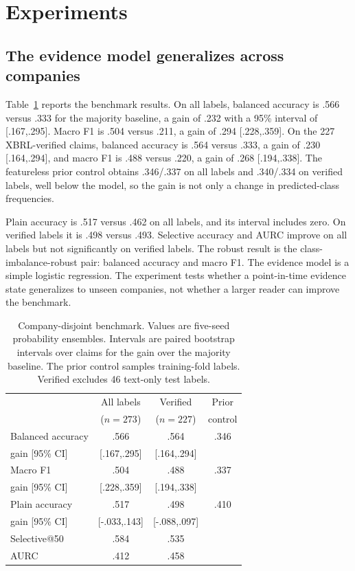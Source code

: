 \documentclass[11pt]{article}
\begin{document}
\section{Experiments}
\label{sec:experiments}

\subsection{The evidence model generalizes across companies}
Table~\ref{tab:benchmark} reports the benchmark results. On all labels, balanced accuracy is .566 versus .333 for the majority baseline, a gain of .232 with a 95\% interval of [.167,.295]. Macro F1 is .504 versus .211, a gain of .294 [.228,.359]. On the 227 XBRL-verified claims, balanced accuracy is .564 versus .333, a gain of .230 [.164,.294], and macro F1 is .488 versus .220, a gain of .268 [.194,.338]. The featureless prior control obtains .346/.337 on all labels and .340/.334 on verified labels, well below the model, so the gain is not only a change in predicted-class frequencies.

Plain accuracy is .517 versus .462 on all labels, and its interval includes zero. On verified labels it is .498 versus .493. Selective accuracy and AURC improve on all labels but not significantly on verified labels. The robust result is the class-imbalance-robust pair: balanced accuracy and macro F1. The evidence model is a simple logistic regression. The experiment tests whether a point-in-time evidence state generalizes to unseen companies, not whether a larger reader can improve the benchmark.

\begin{table}[t]
\centering
\small
\setlength{\tabcolsep}{3pt}
\begin{tabular}{lccc}
\toprule
 & All labels & Verified & Prior \\
 & ($n=273$) & ($n=227$) & control \\
\midrule
Balanced accuracy & .566 & .564 & .346 \\
\quad gain [95\% CI] & [.167,.295] & [.164,.294] & \\
Macro F1 & .504 & .488 & .337 \\
\quad gain [95\% CI] & [.228,.359] & [.194,.338] & \\
Plain accuracy & .517 & .498 & .410 \\
\quad gain [95\% CI] & [-.033,.143] & [-.088,.097] & \\
Selective@50 & .584 & .535 & \\
AURC & .412 & .458 & \\
\bottomrule
\end{tabular}
\caption{Company-disjoint benchmark. Values are five-seed probability ensembles. Intervals are paired bootstrap intervals over claims for the gain over the majority baseline. The prior control samples training-fold labels. Verified excludes 46 text-only test labels.}
\label{tab:benchmark}
\end{table}
\end{document}

